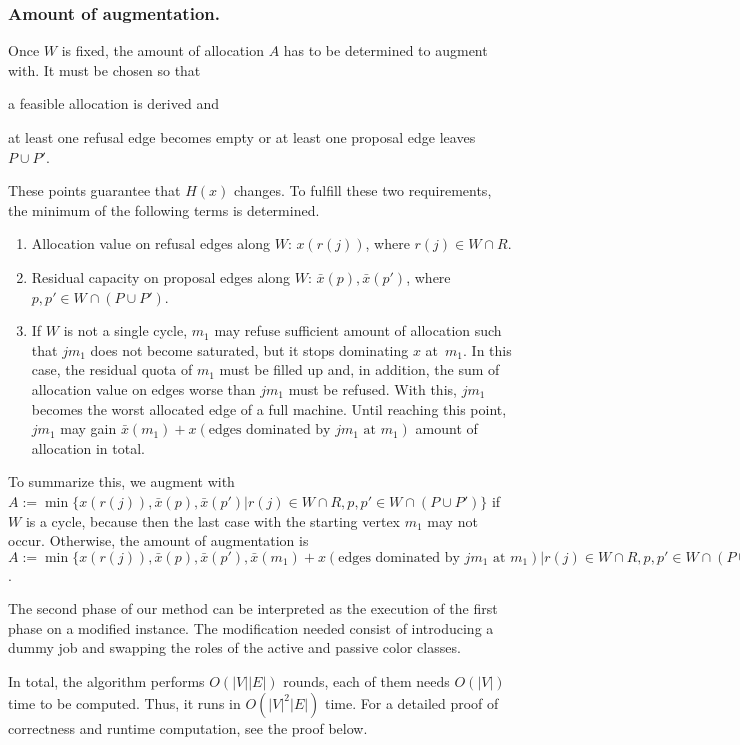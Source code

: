 \documentclass{llncs}
\begin{document}
\subsubsection*{Amount of augmentation.}
Once $W$ is fixed, the amount of allocation $A$ has to be determined to augment with. It must be chosen so that
\begin{inparaenum}[1)]
	\item a feasible allocation is derived and 
	\item at least one refusal edge becomes empty or at least one proposal edge leaves~$P \cup P'$. \end{inparaenum} These points guarantee that $H(x)$ changes. To fulfill these two requirements, the minimum of the following terms is determined.
	\begin{enumerate}
		\item Allocation value on refusal edges along $W$: $x(r(j))$, where $r(j) \in W \cap R$.
		\item Residual capacity on proposal edges along $W$: $\bar{x}(p), \bar{x}(p')$, where $p, p' \in W \cap (P  \cup P')$.	
		\item If $W$ is not a single cycle, $m_1$ may refuse sufficient amount of allocation such that $jm_1$ does not become saturated, but it stops dominating $x$ at~$m_1$. In this case, the residual quota of $m_1$ must be filled up and, in addition, the sum of allocation value on edges worse than $jm_1$ must be refused. With this, $jm_1$ becomes the worst allocated edge of a full machine. Until reaching this point, $jm_1$ may gain $\bar{x}(m_1) + x(\text{edges dominated by }jm_1 \text{ at }m_1)$ amount of allocation in total.
	\end{enumerate}
To summarize this, we augment with $A := \min\{x(r(j)), \bar{x}(p), \bar{x}(p')|  r(j) \in W \cap R, p, p' \in W \cap (P  \cup P')\}$ if $W$ is a cycle, because then the last case with the starting vertex $m_1$ may not occur. Otherwise, the amount of augmentation is $A := \min \{x(r(j)), \bar{x}(p), \bar{x}(p'), \bar{x}(m_1) + x(\text{edges dominated by }jm_1 \text{ at }m_1) | r(j) \in W \cap R, p, p' \in W \cap (P  \cup P')\}$.



The second phase of our method can be interpreted as the execution of the first phase on a modified instance. The modification needed consist of introducing a dummy job and swapping the roles of the active and passive color classes.

In total, the algorithm performs $O(|V||E|)$ rounds, each of them needs $O(|V|)$ time to be computed. Thus, it runs in $O(|V|^2|E|)$ time. For a detailed proof of correctness and runtime computation, see the proof below.
\end{document}
